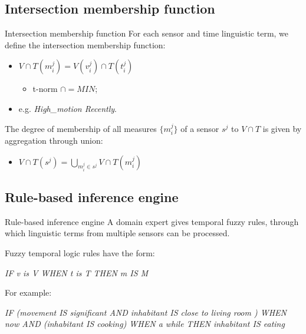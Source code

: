 \documentclass[9pt, handout]{beamer}
\begin{document}
    \subsection{Intersection membership function}
      \begin{frame}{Intersection membership function}
        \pause
        For each sensor and time linguistic term, we define the intersection membership function:
        \pause
        \begin{itemize}
          \item $V \cap T (m^j_i) = V(v^j_i) \cap T(t^j_i)$
          \begin{itemize}
            \item t-norm $\cap = MIN$;
          \end{itemize}
          \pause
          \item e.g. \textit{High\_motion Recently}.
        \end{itemize}
        
        \pause
        
        \pause
        The degree of membership of all measures $\{m^j_i\}$ of a sensor $s^j$ to $V \cap T$ is given by aggregation through union:
        \pause
        \begin{itemize}
          \item $V \cap T(s^j) = \bigcup_{m^j_i \in s^j} V \cap T (m^j_i)$
        \end{itemize}
      \end{frame}
      
    \subsection{Rule-based inference engine}
      \begin{frame}{Rule-based inference engine}
        \pause
        A domain expert gives temporal fuzzy rules, through which linguistic terms from multiple sensors can be processed.
        
        \pause
        \vspace{1.5em}
        Fuzzy temporal logic rules have the form:
        \pause
        \begin{center}
          \textit{IF v is V WHEN t is T THEN m IS M}
        \end{center}
        
        \pause
        \vspace{1.5em}
        For example:
        \begin{center}
          \textit{IF (movement IS significant AND inhabitant IS close to living room ) WHEN now AND (inhabitant IS cooking) WHEN a while THEN inhabitant IS eating}
        \end{center}
      \end{frame}
    
\end{document}
